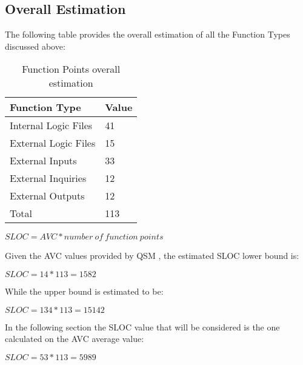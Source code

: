 \subsection{Overall Estimation}
The following table provides the overall estimation of all the Function Types discussed above:

\begin{table}[h!tb]
	\centering
	\caption{Function Points overall estimation}
	\label{tab:overall_fps}
	\begin{tabular}{|l|l|}
		\hline
		Function Type		&	Value	\\ \hline
		Internal Logic Files	&	41	\\
		External Logic Files	&	15	\\ 
		External Inputs			&	33	\\ 
		External Inquiries		&	12	\\ 
		External Outputs		&	12	\\ \hline
		Total					&	113	\\
		\hline
	\end{tabular}
\end{table}

\blindtext

\begin{center}
$SLOC = AVC * number \ of \ function \ points$
\end{center}
Given the AVC values provided by QSM \cite{avc_qsm}, the estimated SLOC lower bound is:
\begin{center}
$SLOC = 14 * 113 = 1582$
\end{center}
While the upper bound is estimated to be:
\begin{center}
$SLOC = 134 * 113 = 15142$
\end{center}
In the following section the SLOC value that will be considered is the one calculated on the AVC average value:
\begin{center}
$SLOC = 53 * 113 = 5989$
\end{center}
